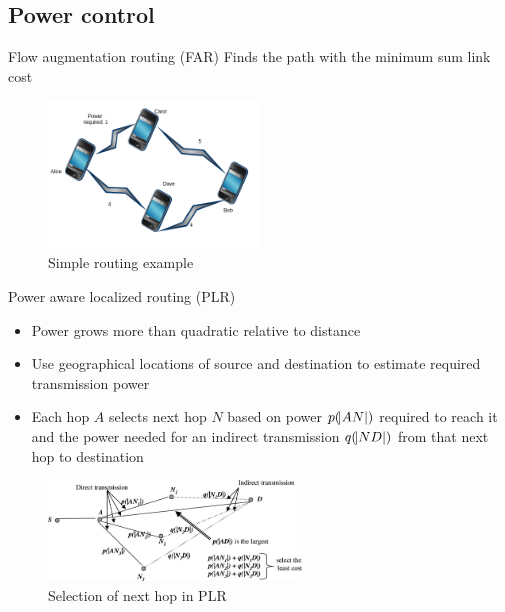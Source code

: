 \documentclass{beamer}
\begin{document}
\subsection{Power control}
\begin{frame}{Flow augmentation routing (FAR)\cite{chang2000energy}}
    Finds the path with the minimum sum link cost
\begin{figure}
\centering
\includegraphics[width=0.5\textwidth]{images/far}
\caption{Simple routing example}
\end{figure}
\end{frame}
\begin{frame}{Power aware localized routing (PLR)\cite{stojmenovic2001power}}
    \begin{itemize}
        \item Power grows more than quadratic relative to distance
        \item Use geographical locations of source and destination to estimate required transmission power
        \item Each hop $A$ selects next hop $N$ based on power $p(\abs{AN})$ required to reach it and
              the power needed for an indirect transmission $q(\abs{ND})$ from that next hop to destination
    \end{itemize}
\begin{figure}
\centering
\includegraphics[width=0.6\textwidth]{images/plr-example}
\caption{Selection of next hop in PLR\cite{alotaibi2012survey}}
\label{plrexample}
\end{figure}
\end{frame}
\end{document}
